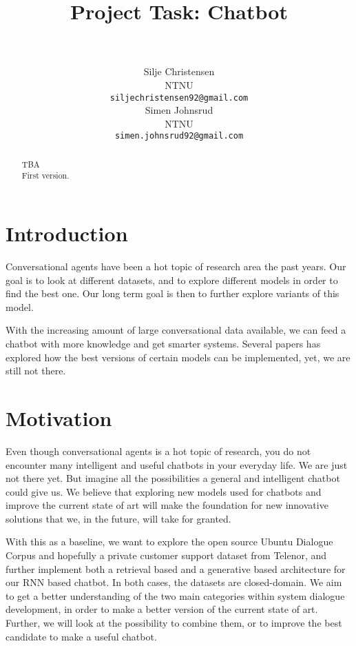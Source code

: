 \documentclass{article} %
\title{Project Task: Chatbot}
\author{
 \\
\texttt{} \\
\AND
Silje Christensen \\
NTNU \\
\texttt{siljechristensen92@gmail.com} \\
\And
Simen Johnsrud \\
NTNU \\
\texttt{simen.johnsrud92@gmail.com} \\
}
\begin{document}
\maketitle

\begin{abstract}
TBA\\
First version.
\end{abstract}

\section{Introduction}
Conversational agents have been a hot topic of research area the past years. 
Our goal is to look at different datasets, and to explore different models in order to find the best one. Our long term goal is then to further explore variants of this model. 

With the increasing amount of large conversational data available, we can feed a chatbot with more knowledge and get smarter systems. Several papers has explored how the best versions of certain models can be implemented, yet, we are still not there. 

\section{Motivation}
Even though conversational agents is a hot topic of research, you do not encounter many intelligent and useful chatbots in your everyday life. We are just not there yet. But imagine all the possibilities a general and intelligent chatbot could give us. We believe that exploring new models used for chatbots and improve the current state of art will make the foundation for new innovative solutions that we, in the future, will take for granted. 

With this as a baseline, we want to explore the open source Ubuntu Dialogue Corpus and hopefully a private customer support dataset from Telenor, and further implement both a retrieval based and a generative based architecture for our RNN based chatbot. In both cases, the datasets are closed-domain. We aim to get a better understanding of the two main categories within system dialogue development, in order to make a better version of the current state of art. Further, we will look at the possibility to combine them, or to improve the best candidate to make a useful chatbot. 
\end{document}
